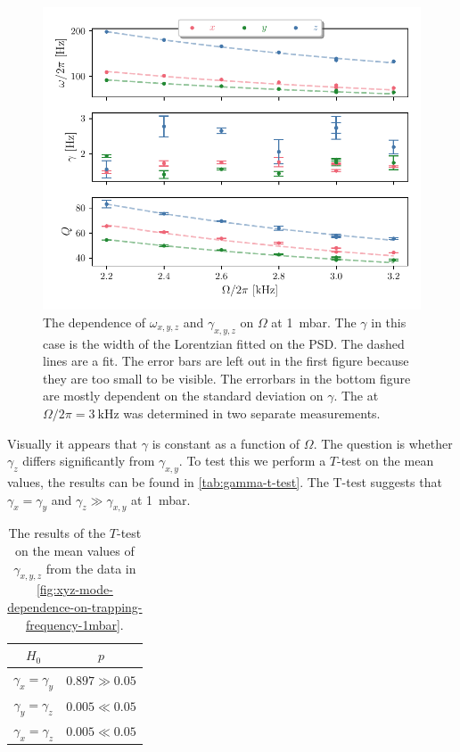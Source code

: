 \begin{figure}
    \centering
    \includegraphics{figures/data/xyz_mode_dependence_on_driving_frequency.pdf}
    \caption{The dependence of $\omega_{x,y,z}$ and $\gamma_{x,y,z}$ on $\Omega$ at \qty{1}{\milli\bar}. The $\gamma$ in this case is the width of the Lorentzian fitted on the PSD. The dashed lines are a fit. The error bars are left out in the first figure because they are too small to be visible. The errorbars in the bottom figure are mostly dependent on the standard deviation on $\gamma$. The \zmode at $\Omega/2\pi = \qty{3}{\kilo\hertz}$ was determined in two separate measurements.}
    \label{fig:xyz-mode-dependence-on-trapping-frequency-1mbar}
\end{figure}

Visually it appears that $\gamma$ is constant as a function of $\Omega$. The question is whether $\gamma_z$ differs significantly from $\gamma_{x,y}$. To test this we perform a $T$-test on the mean values, the results can be found in \autoref{tab:gamma-t-test}. The T-test suggests that $\gamma_x = \gamma_y$ and $\gamma_z \gg \gamma_{x,y}$ at \qty{1}{\milli\bar}.

\begin{table}
    \centering
    \begin{tabular}{cc}
        \toprule
        $H_0$ & $p$ \\
        \midrule
        $\gamma_x = \gamma_y$ & \textcolor{x_axis_color}{$0.897 \gg 0.05$} \\
        $\gamma_y = \gamma_z$ & \textcolor{y_axis_color}{$0.005 \ll 0.05$} \\
        $\gamma_x = \gamma_z$ & \textcolor{y_axis_color}{$0.005 \ll 0.05$} \\
        \bottomrule
    \end{tabular}
    \caption{The results of the $T$-test on the mean values of $\gamma_{x,y,z}$ from the data in \autoref{fig:xyz-mode-dependence-on-trapping-frequency-1mbar}.}
    \label{tab:gamma-t-test}
\end{table}

